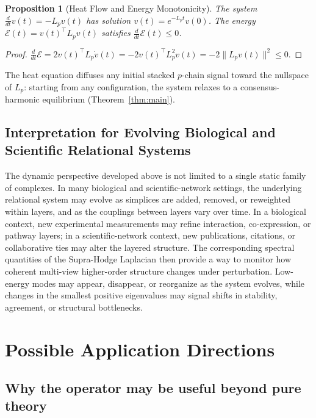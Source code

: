 \documentclass[11pt]{article}
\newtheorem{proposition}[theorem]{Proposition}
\theoremstyle{definition}
\theoremstyle{remark}
\begin{document}
\begin{proposition}[Heat Flow and Energy Monotonicity]
\label{prop:heat}
The system $\frac{d}{dt}v(t) = -L_p v(t)$ has solution $v(t)=e^{-L_p t}v(0)$.
The energy $\mathcal{E}(t) = v(t)^\top L_p v(t)$ satisfies
$\frac{d}{dt}\mathcal{E}(t) \leq 0$.
\end{proposition}

\begin{proof}
$\frac{d}{dt}\mathcal{E} = 2v(t)^\top L_p\dot{v}(t) = -2v(t)^\top L_p^2
v(t) = -2\|L_p v(t)\|^2 \leq 0$.
\end{proof}

The heat equation diffuses any initial stacked $p$-chain signal toward the nullspace of $L_p$:
starting from any configuration, the system relaxes to a consensus-harmonic
equilibrium (Theorem~\ref{thm:main}).

\subsection{Interpretation for Evolving Biological and Scientific Relational Systems}

The dynamic perspective developed above is not limited to a single static family of complexes. In many biological and scientific-network settings, the underlying relational system may evolve as simplices are added, removed, or reweighted within layers, and as the couplings between layers vary over time. In a biological context, new experimental measurements may refine interaction, co-expression, or pathway layers; in a scientific-network context, new publications, citations, or collaborative ties may alter the layered structure. The corresponding spectral quantities of the Supra-Hodge Laplacian then provide a way to monitor how coherent multi-view higher-order structure changes under perturbation. Low-energy modes may appear, disappear, or reorganize as the system evolves, while changes in the smallest positive eigenvalues may signal shifts in stability, agreement, or structural bottlenecks.


\section{Possible Application Directions}
\label{sec:application}

\subsection{Why the operator may be useful beyond pure theory}
\end{document}
